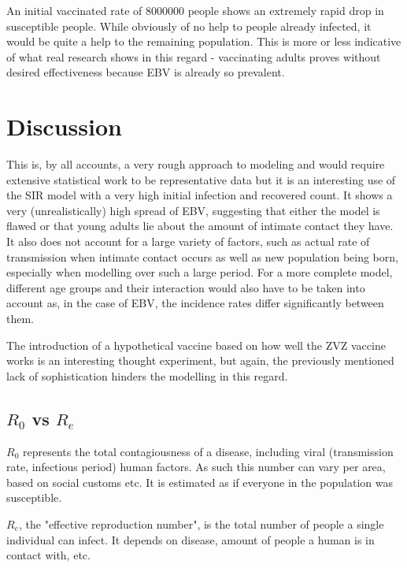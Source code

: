 \documentclass[12pt]{article}
\begin{document}
An initial vaccinated rate of 8000000 people shows an extremely rapid drop in susceptible people. While obviously
of no help to people already infected, it would be quite a help to the remaining population. This is more or less indicative
of what real research shows in this regard - vaccinating adults proves without desired effectiveness because EBV is already
so prevalent.

\section{Discussion}

This is, by all accounts, a very rough approach to modeling and would require extensive statistical work to be representative data but it is an interesting
use of the SIR model with a very high initial infection and recovered count. It shows a very (unrealistically) high spread of EBV, suggesting that either the model
is flawed or that young adults lie about the amount of intimate contact they have. It also does not account for a large variety of factors, such as actual rate of transmission
when intimate contact occurs as well as new population being born, especially when modelling over such a large period. For a more complete model, different age groups and
their interaction would also have to be taken into account as, in the case of EBV, the incidence rates differ significantly between them.

The introduction of a hypothetical vaccine based on how well the ZVZ vaccine works is an interesting thought experiment, but again, the previously mentioned lack
of sophistication hinders the modelling in this regard.

\subsection{$R_{0}$ vs $R_{e}$}

$R_{0}$ represents the total contagiousness of a disease, including viral (transmission rate, infectious period) human factors. As such this number can vary per area, based
on social customs etc. It is estimated as if everyone in the population was susceptible.

$R_{e}$, the "effective reproduction number", is the total number of people a single individual can infect.
It depends on disease, amount of people a human is in contact with, etc.\cite{RoRe}

\printbibliography
\end{document}
